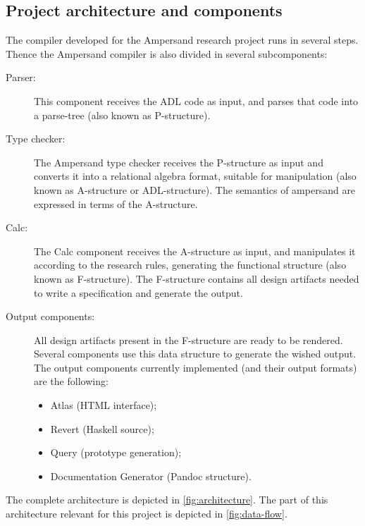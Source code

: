 \subsection{Project architecture and components}
\label{subsec:architecture}
The compiler developed for the Ampersand research project runs in several steps.
Thence the Ampersand compiler is also divided in several subcomponents:
%
%
%
%
\begin{description}
	\item[Parser:] This component receives the ADL code as input, and parses that code into a parse-tree (also known as P-structure).
	\item[Type checker:] The Ampersand type checker receives the P-structure as input and converts it into a relational algebra format, suitable for manipulation (also known as A-structure or ADL-structure).
		 The semantics of ampersand are expressed in terms of the A-structure.
	\item[Calc:] The Calc component receives the A-structure as input, and manipulates it according to the research rules, generating the functional structure (also known as F-structure).
		The F-structure contains all design artifacts needed to write a specification and generate the output.
	\item[Output components:] All design artifacts present in the F-structure are ready to be rendered.
		Several components use this data structure to generate the wished output.
		The output components currently implemented (and their output formats) are the following: 
		\begin{itemize}
			\item Atlas (HTML interface);
			\item Revert (Haskell source);
			\item Query (prototype generation);
			\item Documentation Generator (Pandoc structure).
		\end{itemize}
\end{description}
%
The complete architecture is depicted in \autoref{fig:architecture}.
The part of this architecture relevant for this project is depicted in \autoref{fig:data-flow}.
